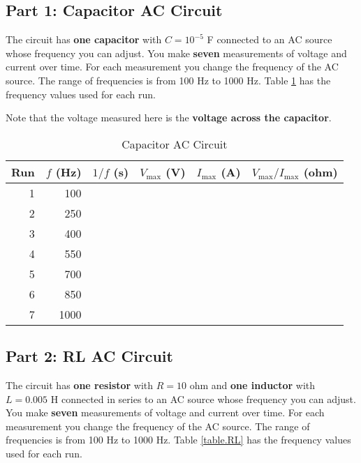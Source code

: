 \subsection{Part 1: Capacitor AC Circuit}
The circuit has \textbf{one capacitor} with $C = 10^{-5}$ F connected to an AC source whose frequency you can adjust. You make \textbf{seven} measurements of voltage and current over time. For each measurement you change the frequency of the AC source. The range of frequencies is from 100 Hz to 1000 Hz. Table \ref{table.capacitor} has the frequency values used for each run.

Note that the voltage measured here is the \textbf{voltage across the capacitor}.
\begin{table}[ht!]
	\begin{center}
		\begin{tabular}{|r|r|r|r|r|r|}\hline
			Run & $f$ (Hz) & $1/f$ (s) & $V_{\text{max}}$ (V) & $I_{\text{max}}$ (A) & $V_{\text{max}}/I_{\text{max}}$ (ohm) \\
			\hline
			1 & 100 & & & & \\
			2 & 250 & & & & \\
			3 & 400 & & & & \\
			4 & 550 & & & & \\
			5 & 700 & & & & \\
			6 & 850 & & & & \\
			7 & 1000 & & & & \\
			\hline
		\end{tabular}
	\end{center}
	\caption{Capacitor AC Circuit}
	\label{table.capacitor}
\end{table}
\subsection{Part 2: RL AC Circuit}
The circuit has \textbf{one resistor} with $R = 10 $ ohm and \textbf{one inductor} with $L = 0.005$ H connected in series to an AC source whose frequency you can adjust. You make \textbf{seven} measurements of voltage and current over time. For each measurement you change the frequency of the AC source. The range of frequencies is from 100 Hz to 1000 Hz. Table \ref{table.RL} has the frequency values used for each run.

